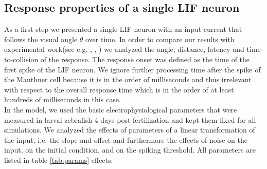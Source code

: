 \documentclass[a4paper,10pt]{scrartcl}
\begin{document}
	\subsection{Response properties of a single LIF neuron}
	As a first step we presented a single LIF neuron with an input current that follows the visual angle $\theta$ over time.
	In order to compare our results with experimental work(see e.g. \cite{Bhattacharyya2017}, \cite{Temizer2015}, \cite{Dunn2016}) we analyzed the angle, distance, latency and time-to-collision of the response.
	The response onset was defined as the time of the first spike of the LIF neuron.
	We ignore further processing time after the spike of the Mauthner cell because it is in the order of milliseconds \cite{Preuss2003} and thus irrelevant with respect to the overall response time which is in the order of at least hundreds of milliseconds in this case.\\
	In the model, we used the basic electrophysiological parameters that were measured in larval zebrafish 4 days post-fertilization \citep{Koyama2016} and kept them fixed for all simulations.
	We analyzed the effects of parameters of a linear transformation of the input, i.e. the slope and offset and furthermore the effects of noise on the input, on the initial condition, and on the spiking threshold.
	All parameters are listed in table \ref{tab:params}
	effects:
\end{document}
